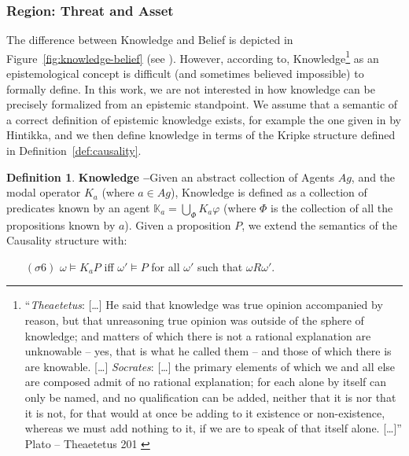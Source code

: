 \documentclass{article}
\theoremstyle{definition}
\newtheorem{definition}{Definition}[section]
\theoremstyle{corollary}
\theoremstyle{lemma}
\theoremstyle{theorem}
\theoremstyle{theorem}
\newcommand{\modalrelation}{R}
\newcommand{\world}{\omega}
\newcommand{\interpretation}{\sigma}
\newcommand{\knowledge}[1]{\mathbb{K}_{#1}}
\newcommand{\knows}[2]{K_{#1}#2}
\begin{document}
\subsubsection{Region: Threat and Asset}\label{sec:vulnerabilitydefect}

The difference between Knowledge and Belief is depicted in
Figure~\ref{fig:knowledge-belief} (see \autocite{wiki-knowledgebelief}).  However,
according to\autocite{Gettier2012knowledge},
Knowledge\footnote{``\emph{Theaetetus}: [\ldots] He said that knowledge was
true opinion accompanied by reason, but that unreasoning true opinion was
outside of the sphere of knowledge; and matters of which there is not a
rational explanation are unknowable -- yes, that is what he called them -- and
those of which there is are knowable. [\ldots] \emph{Socrates}: [\ldots] the
primary elements of which we and all else are composed admit of no rational
explanation; for each alone by itself can only be named, and no qualification
can be added, neither that it is nor that it is not, for that would at once be
adding to it existence or non-existence, whereas we must add nothing to it, if
we are to speak of that itself alone.  [\ldots]'' Plato -- Theaetetus 201
\autocite{Plato1914Plato}} as an epistemological concept is difficult (and
sometimes believed impossible\autocite{citation}) to formally define. In this
work, we are not interested in 
how knowledge can be precisely formalized from an epistemic standpoint. 
We assume that a semantic of a correct definition of epistemic knowledge exists,
for example the one given in\autocite{Hintikka1962knwoledge} by Hintikka, and we then define 
knowledge in terms of the Kripke structure defined in Definition~\ref{def:causality}.

\begin{definition}{\bf Knowledge --}\label{def:knowledge}
Given an abstract collection of Agents $Ag$, and the modal operator
	$\knows{a}{}$ (where $a\in Ag$), Knowledge is defined as a collection
	of predicates known by an agent $\knowledge{a}=\bigcup_\Phi \knows{a}{\varphi}$ 
	(where $\Phi$ is the collection of all the propositions known by $a$).
	Given a proposition $P$, we extend the semantics of the Causality structure with:
	\begin{enumerate}[noitemsep]
		\item[$(\interpretation6)$] $\world\models\knows{a}{P}$ iff
			$\world'\models P$ for all $\world'$ such that
			$\world\modalrelation\world'$.
	\end{enumerate}
\end{definition}
\end{document}
